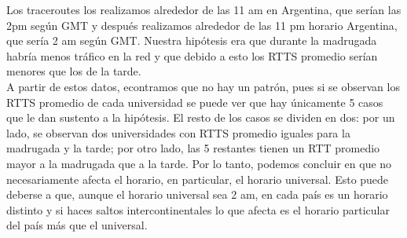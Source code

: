 \documentclass{article}
\begin{document}
        Los traceroutes los realizamos alrededor de las 11 am en Argentina, que serían las 2pm según GMT y después realizamos alrededor de las 11 pm horario Argentina, que sería 2 am según GMT. Nuestra hipótesis era que durante la madrugada habría menos tráfico en la red y que debido a esto los RTTS promedio serían menores que los de la tarde.  \\
        A partir de estos datos, econtramos que no hay un patrón, pues si se observan los RTTS promedio de cada universidad se puede ver que hay únicamente 5 casos que le dan sustento a la hipótesis. El resto de los casos se dividen en dos: por un lado, se observan dos universidades con RTTS promedio iguales para la madrugada y la tarde; por otro lado, las 5 restantes tienen un RTT promedio mayor a la madrugada que a la tarde. Por lo tanto, podemos concluir en que no necesariamente afecta el horario, en particular, el horario universal. Esto puede deberse a que, aunque el horario universal sea 2  am, en cada país es un horario distinto y si haces saltos intercontinentales lo que afecta es el horario particular del país más que el universal. 
        \\
        \\
        
\end{document}
